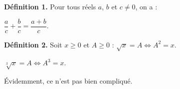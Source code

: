 \documentclass[12pt,french]{article}
\begin{document}
\textbf{Définition 1.} Pour tous réels $a$, $b$ et $c \neq 0$, on a :\par
$\dfrac{a}{c}+\dfrac{b}{c}=\dfrac{a+b}{c}$. %

\textbf{Définition 2.} Soit $x \geq 0$ et $A \geq 0$ :
$\sqrt{x}=A \Leftrightarrow A^2 = x$. %


$\sqrt[3]{x} =A\Leftrightarrow A^3 = x$. %

Évidemment,
ce
n'est
pas                bien                  compliqué.
\end{document}

